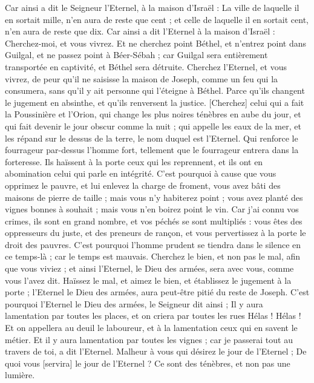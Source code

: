 \begin{multicols}{2}
Car ainsi a dit le Seigneur l'Eternel, à la maison d'Israël : La ville de laquelle il en sortait mille, n'en aura de reste que cent ; et celle de laquelle il en sortait cent, n'en aura de reste que dix.
Car ainsi a dit l'Eternel à la maison d'Israël : Cherchez-moi, et vous vivrez.
Et ne cherchez point Béthel, et n'entrez point dans Guilgal, et ne passez point à Béer-Sébah ; car Guilgal sera entièrement transportée en captivité, et Béthel sera détruite.
Cherchez l'Eternel, et vous vivrez, de peur qu'il ne saisisse la maison de Joseph, comme un feu qui la consumera, sans qu'il y ait personne qui l'éteigne à Béthel.
Parce qu'ils changent le jugement en absinthe, et qu'ils renversent la justice.
[Cherchez] celui qui a fait la Poussinière et l'Orion, qui change les plus noires ténèbres en aube du jour, et qui fait devenir le jour obscur comme la nuit ; qui appelle les eaux de la mer, et les répand sur le dessus de la terre, le nom duquel est l'Eternel.
Qui renforce le fourrageur par-dessus l'homme fort, tellement que le fourrageur entrera dans la forteresse.
Ils haïssent à la porte ceux qui les reprennent, et ils ont en abomination celui qui parle en intégrité.
C'est pourquoi à cause que vous opprimez le pauvre, et lui enlevez la charge de froment, vous avez bâti des maisons de pierre de taille ; mais vous n'y habiterez point ; vous avez planté des vignes bonnes à souhait ; mais vous n'en boirez point le vin.
Car j'ai connu vos crimes, ils sont en grand nombre, et vos péchés se sont multipliés : vous êtes des oppresseurs du juste, et des preneurs de rançon, et vous pervertissez à la porte le droit des pauvres.
C'est pourquoi l'homme prudent se tiendra dans le silence en ce temps-là ; car le temps est mauvais.
Cherchez le bien, et non pas le mal, afin que vous viviez ; et ainsi l'Eternel, le Dieu des armées, sera avec vous, comme vous l'avez dit.
Haïssez le mal, et aimez le bien, et établissez le jugement à la porte ; l'Eternel le Dieu des armées, aura peut-être pitié du reste de Joseph.
C'est pourquoi l'Eternel le Dieu des armées, le Seigneur dit ainsi ; Il y aura lamentation par toutes les places, et on criera par toutes les rues Hélas ! Hélas ! Et on appellera au deuil le laboureur, et à la lamentation ceux qui en savent le métier.
Et il y aura lamentation par toutes les vignes ; car je passerai tout au travers de toi, a dit l'Eternel.
Malheur à vous qui désirez le jour de l'Eternel ; De quoi vous [servira] le jour de l'Eternel ? Ce sont des ténèbres, et non pas une lumière.

\end{multicols}
